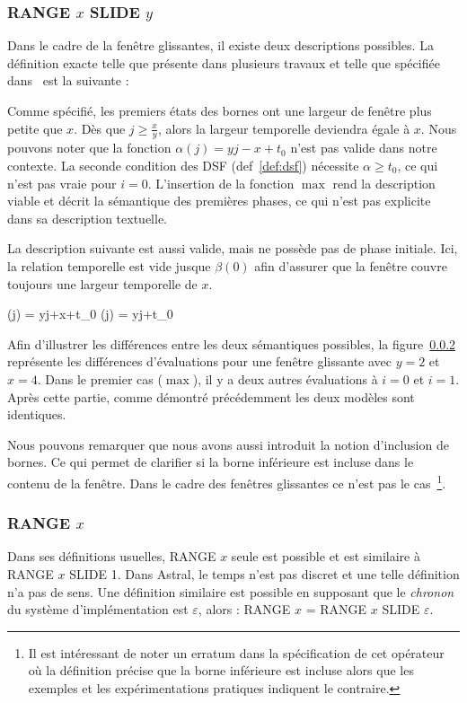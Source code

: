 \subsubsection{RANGE $x$ SLIDE $y$}
Dans le cadre de la fenêtre glissantes, il existe deux descriptions possibles. La définition exacte telle que présente dans plusieurs travaux et telle que spécifiée dans~\cite{Jain:spread} est la suivante :


Comme spécifié, les premiers états des bornes ont une largeur de fenêtre plus petite que $x$. Dès que $j \geq \frac xy$, alors la largeur temporelle deviendra égale à $x$. Nous pouvons noter que la fonction $\alpha(j) = yj-x+t_0$ n'est pas valide dans notre contexte. La seconde condition des DSF (def~\ref{def:dsf}) nécessite $\alpha \geq t_0$, ce qui n'est pas vraie pour $i=0$. L'insertion de la fonction $\max$ rend la description viable et décrit la sémantique des premières phases, ce qui n'est pas explicite dans sa description textuelle.

La description suivante est aussi valide, mais ne possède pas de phase initiale. Ici, la relation temporelle est vide jusque $\beta(0)$ afin d'assurer que la fenêtre couvre toujours une largeur temporelle de $x$.

	{\beta(j) = yj+x+t_0}
	{\alpha(j) = yj+t_0}

Afin d'illustrer les différences entre les deux sémantiques possibles, la figure~\ref{} représente les différences d'évaluations pour une fenêtre glissante avec $y=2$ et $x=4$. Dans le premier cas ($\max$), il y a deux autres évaluations à $i=0$ et $i=1$. Après cette partie, comme démontré précédemment les deux modèles sont identiques.

Nous pouvons remarquer que nous avons aussi introduit la notion d'inclusion de bornes. Ce qui permet de clarifier si la borne inférieure est incluse dans le contenu de la fenêtre. Dans le cadre des fenêtres glissantes ce n'est pas le cas~\footnote{Il est intéressant de noter un erratum dans la spécification de cet opérateur où la définition précise que la borne inférieure est incluse alors que les exemples et les expérimentations pratiques indiquent le contraire.}.

\subsubsection{RANGE $x$}
Dans ses définitions usuelles, RANGE $x$ seule est possible et est similaire à RANGE $x$ SLIDE 1. Dans Astral, le temps n'est pas discret et une telle définition n'a pas de sens. Une définition similaire est possible en supposant que le \textit{chronon} du système d'implémentation est $\varepsilon$, alors : RANGE $x$ = RANGE $x$ SLIDE $\varepsilon$.

